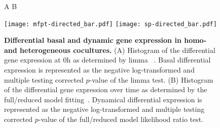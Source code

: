 \begin{itemize}
\begin{figure}[!ht]
\hskip 0.5in A \hskip 2.5in B
\begin{center}
\texttt{[image: mfpt-directed\_bar.pdf]}
\texttt{[image: sp-directed\_bar.pdf]}
\end{center}
\caption[Differential basal and dynamic gene expression]{
{\bf Differential basal and dynamic gene expression in homo- and heterogeneous 
cocultures.} 
(A) Histogram of the differential gene expression at 0h as determined by limma~%
\citep{Smyth2004}. 
Basal differential expression is 
represented as the negative log-transformed and multiple
testing corrected $p$-value of the limma test.
(B) Histogram of the differential gene expression over time as determined by the
full/reduced model fitting~\citep{Mar2009}.
Dynamical differential expression is 
represented as the negative log-transformed and multiple
testing corrected $p$-value of the full/reduced model
likelihood ratio test.
}
\label{fig:mfpt_sp_bar}
\end{figure}

\end{itemize}








